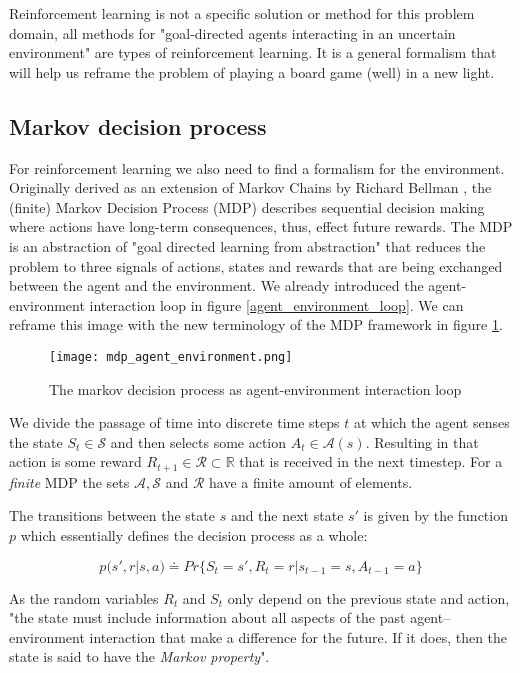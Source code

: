 Reinforcement learning is not a specific solution or method for this problem domain, all methods for "goal-directed agents interacting in an uncertain environment" \cite[p. 3]{sutton_reinforcement_2018} are types of reinforcement learning. It is a general formalism that will help us reframe the problem of playing a board game (well) in a new light.

\subsection{Markov decision process}
For reinforcement learning we also need to find a formalism for the environment. Originally derived as an extension of Markov Chains by Richard Bellman \cite{yang_markov_2019, bellman_markovian_1957}, the (finite) Markov Decision Process (MDP) describes sequential decision making where actions have long-term consequences, thus, effect future rewards. The MDP is an abstraction of "goal directed learning from abstraction" that reduces the problem to three signals of actions, states and rewards that are being exchanged between the agent and the environment. We already introduced the agent-environment interaction loop in figure \ref{agent_environment_loop}. We can reframe this image with the new terminology of the MDP framework in figure \ref{mdp_agent_environment}.

\begin{figure}
    \centering
    \texttt{[image: mdp\_agent\_environment.png]}
    \caption{The markov decision process as agent-environment interaction loop}
    \label{mdp_agent_environment}
\end{figure}

We divide the passage of time into discrete time steps $ t $ at which the agent senses the state $ S_t \in \mathcal{S} $ and then selects some action $ A_t \in \mathcal{A}(s) $. Resulting in that action is some reward $ R_{t+1} \in \mathcal{R} \subset \mathbb{R} $ that is received in the next timestep. For a \textit{finite} MDP the sets $ \mathcal{A}, \mathcal{S}$ and $ \mathcal{R} $ have a finite amount of elements.

The transitions between the state $ s $ and the next state $ s' $ is given by the function $ p $ which essentially defines the decision process as a whole:

$$
    p(s', r | s, a) \doteq Pr\{S_t=s', R_t = r | s_{t-1} = s, A_{t-1}=a\}
$$

As the random variables $ R_t $ and $ S_t $ only depend on the previous state and action, "the state must include information about all aspects of the past agent–environment interaction that make a difference for the future. If it does, then the state is said to have the \textit{Markov property}". \cite[p. 48]{sutton_reinforcement_2018}

